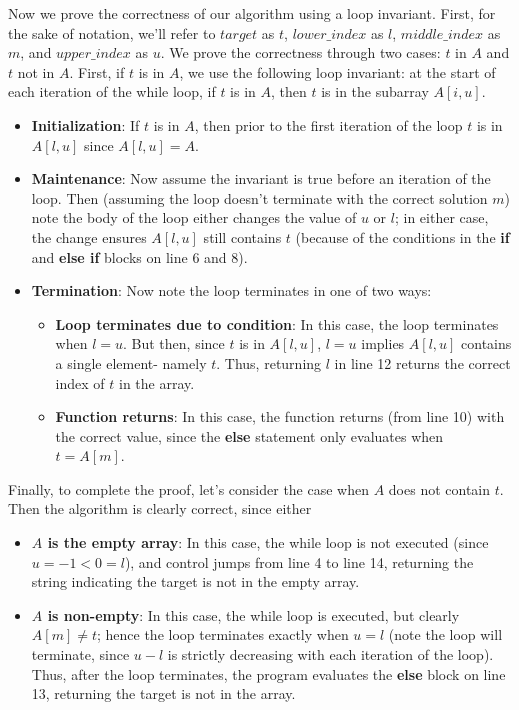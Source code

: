 \documentclass[paper=a4, fontsize=11pt]{scrartcl} %
\numberwithin{equation}{section} %
\numberwithin{figure}{section} %
\numberwithin{table}{section} %
\begin{document}
Now we prove the correctness of our algorithm using a loop invariant. First, for the sake of notation, we'll refer to $target$ as $t$, $lower\_index$ as $l$, $middle\_index$ as $m$, and $upper\_index$ as $u$. We prove the correctness through two cases: $t$ in $A$ and $t$ not in $A$. First, if $t$ is in $A$, we use the following loop invariant: at the start of each iteration of the while loop, if $t$ is in $A$, then $t$ is in the subarray $A[i, u]$.
\begin{itemize}
\item \textbf{Initialization}: If $t$ is in $A$, then prior to the first iteration of the loop $t$ is in $A[l, u]$ since $A[l, u] = A$.
\item \textbf{Maintenance}: Now assume the invariant is true before an iteration of the loop. Then (assuming the loop doesn't terminate with the correct solution $m$) note the body of the loop either changes the value of $u$ or $l$; in either case, the change ensures $A[l,u]$ still contains $t$ (because of the conditions in the \textbf{if} and \textbf{else if} blocks on line 6 and 8).
\item \textbf{Termination}: Now note the loop terminates in one of two ways:
\begin{itemize}
\item \textbf{Loop terminates due to condition}: In this case, the loop terminates when $l = u$. But then, since $t$ is in $A[l,u]$, $l = u$ implies $A[l,u]$ contains a single element- namely $t$. Thus, returning $l$ in line 12 returns the correct index of $t$ in the array.
\item \textbf{Function returns}: In this case, the function returns (from line 10) with the correct value, since the \textbf{else} statement only evaluates when $t = A[m]$.
\end{itemize}
\end{itemize}

Finally, to complete the proof, let's consider the case when $A$ does not contain $t$. Then the algorithm is clearly correct, since either
\begin{itemize}
\item \textbf{$A$ is the empty array}: In this case, the while loop is not executed (since $u = -1 < 0 = l$), and control jumps from line 4 to line 14, returning the string indicating the target is not in the empty array.
\item \textbf{$A$ is non-empty}: In this case, the while loop is executed, but clearly $A[m] \ne t$; hence the loop terminates exactly when $u = l$ (note the loop will terminate, since $u - l$ is strictly decreasing with each iteration of the loop). Thus, after the loop terminates, the program evaluates the \textbf{else} block on line 13, returning the target is not in the array.
\end{itemize}
\end{document}

